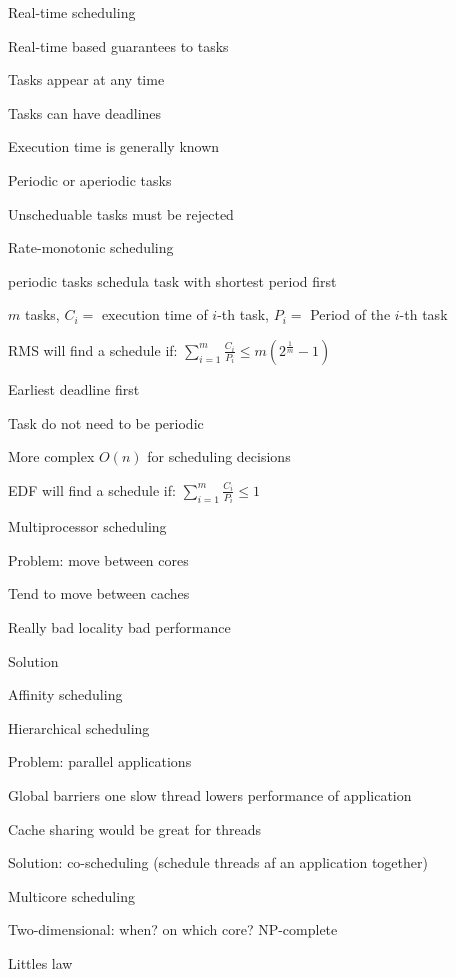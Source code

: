 			\enumend
		\enumend
	\enumend
	\item Real-time scheduling
	\enumstart
		\item Real-time based guarantees to tasks
		\enumstart
			\item Tasks appear at any time
			\item Tasks can have deadlines
			\item Execution time is generally known
			\item Periodic or aperiodic tasks
			\item Unscheduable tasks must be rejected
		\enumend
		\item Rate-monotonic scheduling
		\enumstart
			\item periodic tasks \arrow schedula task with shortest period first
			\item $m$ tasks, $C_i =$ execution time of $i$-th task, $P_i =$ Period of the $i$-th task
			\item RMS will find a schedule if: $\sum_{i=1}^m\frac{C_i}{P_i} \le m(2^{\frac{1}{m}}-1)$
		\enumend
		\item Earliest deadline first
		\enumstart
			\item Task do not need to be periodic
			\item More complex $O(n)$ for scheduling decisions
			\item EDF will find a schedule if: $\sum_{i=1}^m\frac{C_i}{P_i} \le 1$
		\enumend
	\enumend
	\item Multiprocessor scheduling
	\enumstart
		\item Problem: move between cores
		\enumstart
			\item Tend to move between caches
			\item Really bad locality \arrow bad performance
			\item Solution
			\enumstart
				\item Affinity scheduling
				\item Hierarchical scheduling
			\enumend
		\enumend
		\item Problem: parallel applications
		\enumstart
			\item Global barriers \arrow one slow thread lowers performance of application
			\item Cache sharing would be great for threads
			\item Solution: co-scheduling (schedule threads af an application together)
		\enumend
	\enumend
	\item Multicore scheduling
	\enumstart
		\item Two-dimensional: when? on which core? \arrow NP-complete
		\item Littles law
	\enumend
\enumend
